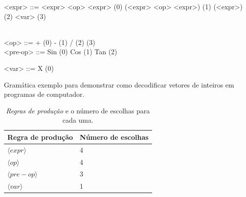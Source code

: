 \begin{Grammar}
	\begin{grammar}
		
		
		<expr> ::=  <expr> <op> <expr> \hspace{10cm} (0) 
		\alt (<expr> <op> <expr>) \hspace{9.7cm} (1)  
		\alt <pre-op> (<expr>) \hspace{10.15cm} (2)  \hspace{12.1cm} (3) \\\
		
		<op> ::=  + \hspace{12.7cm} (0)   \alt - \hspace{12.8cm} (1)  \alt  /  \hspace{12.85cm} (2) \alt * \hspace{12.75cm} (3) \\
		
		<pre-op> ::= Sin  \hspace{12.4cm} (0) \alt Cos
		\hspace{12.3cm} (1) \alt Tan  \hspace{12.35cm} (2)
		
		<var> ::= X  \hspace{12.6cm} (0)
		
		
	\end{grammar}
	
	\caption{Gramática exemplo para demonstrar como decodificar vetores de inteiros em programas de computador.}
	\label{gram:gramatica}
\end{Grammar}


\begin{table}[htb]
	\centering
	\caption{\textit{Regras de produção} e o número de escolhas para cada uma.}
	\label{tab:productionRules}
	\begin{tabular}{|l|l|}
		\hline
		Regra de produção & Número de escolhas \\ \hline
		$\langle expr \rangle$                        & 4       \\ \hline
		$\langle op \rangle$                         & 4       \\ \hline
		$\langle pre-op \rangle$                         & 3       \\ \hline
		$\langle var \rangle$                          & 1       \\ \hline
	\end{tabular}
\end{table}


